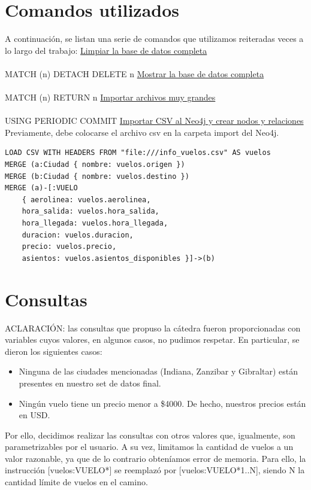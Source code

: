 \documentclass[a4paper,11pt]{article}
\begin{document}
\section*{Comandos utilizados}
A continuación, se listan una serie de comandos que utilizamos reiteradas veces a lo largo del trabajo:
\bigbreak
\noindent
\underline{Limpiar la base de datos completa}\\
\noindent
\\
MATCH (n) DETACH DELETE n
\bigbreak
\noindent
\underline{Mostrar la base de datos completa}\\
\noindent
\\
MATCH (n) RETURN n
\bigbreak
\noindent
\underline{Importar archivos muy grandes}\\
\noindent
\\
USING PERIODIC COMMIT
\bigbreak
\noindent
\underline{Importar CSV al Neo4j y crear nodos y relaciones}\\

Previamente, debe colocarse el archivo csv en la carpeta import del Neo4j.
\begin{lstlisting}[frame=single]
LOAD CSV WITH HEADERS FROM "file:///info_vuelos.csv" AS vuelos
MERGE (a:Ciudad { nombre: vuelos.origen })
MERGE (b:Ciudad { nombre: vuelos.destino })
MERGE (a)-[:VUELO
	{ aerolinea: vuelos.aerolinea,
	hora_salida: vuelos.hora_salida,
	hora_llegada: vuelos.hora_llegada,
	duracion: vuelos.duracion,
	precio: vuelos.precio,
	asientos: vuelos.asientos_disponibles }]->(b)
\end{lstlisting}

\newpage
\section*{Consultas}
ACLARACIÓN: las consultas que propuso la cátedra fueron proporcionadas con variables cuyos valores, en algunos casos, no pudimos respetar. En particular, se dieron los siguientes casos:
\begin{itemize}
\item Ninguna de las ciudades mencionadas (Indiana, Zanzibar y Gibraltar) están presentes en nuestro set de datos final.
\item Ningún vuelo tiene un precio menor a \$4000. De hecho, nuestros precios están en USD.
\end{itemize}
    
Por ello, decidimos realizar las consultas con otros valores que, igualmente, son parametrizables por el usuario.
A su vez, limitamos la cantidad de vuelos a un valor razonable, ya que de lo contrario obteníamos error de memoria.
Para ello, la instrucción [vuelos:VUELO*] se reemplazó por [vuelos:VUELO*1..N], siendo N la cantidad límite de vuelos en el camino.
\end{document}
